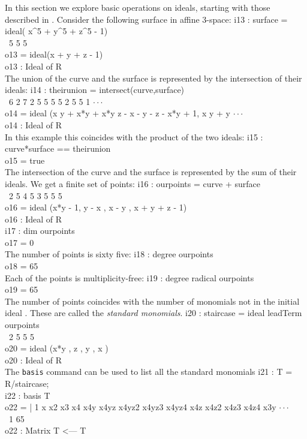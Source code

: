 In this section we explore basic operations on ideals,
starting with those described in \cite[\S 4.3]{CLO1}.
Consider the following surface in affine $3$-space:
\beginOutput
i13 : surface = ideal( x^5 + y^5 + z^5 - 1)\\
\emptyLine
\             5    5    5\\
o13 = ideal(x  + y  + z  - 1)\\
\emptyLine
o13 : Ideal of R\\
\endOutput
The union of the curve and the surface is represented by the 
intersection of their ideals:
\beginOutput
i14 : theirunion = intersect(curve,surface)\\
\emptyLine
\              6 2      7      2 5    5    5    5      2       5 5    1 $\cdot\cdot\cdot$\\
o14 = ideal (x y  + x*y  + x*y z  - x  - y  - z  - x*y  + 1, x y  + y  $\cdot\cdot\cdot$\\
\emptyLine
o14 : Ideal of R\\
\endOutput
In this example this coincides with the product of the two ideals:
\beginOutput
i15 : curve*surface == theirunion\\
\emptyLine
o15 = true\\
\endOutput
The intersection of the curve and the surface is represented by the 
sum of their ideals. We get a finite set of points:
\beginOutput
i16 : ourpoints = curve + surface\\
\emptyLine
\                2       5    4   5    3   5    5    5\\
o16 = ideal (x*y  - 1, y  - x , x  - y , x  + y  + z  - 1)\\
\emptyLine
o16 : Ideal of R\\
\endOutput
\beginOutput
i17 : dim ourpoints\\
\emptyLine
o17 = 0\\
\endOutput
The number of points is sixty five:
\beginOutput
i18 : degree ourpoints\\
\emptyLine
o18 = 65\\
\endOutput
Each of the points is multiplicity-free:
\beginOutput
i19 : degree radical ourpoints\\
\emptyLine
o19 = 65\\
\endOutput
The number of points coincides with the number of 
monomials not in the initial ideal \cite[\S 2.2]{CLO2}.
These are called the {\it standard monomials}.
\beginOutput
i20 : staircase = ideal leadTerm ourpoints\\
\emptyLine
\                2   5   5   5\\
o20 = ideal (x*y , z , y , x )\\
\emptyLine
o20 : Ideal of R\\
\endOutput
The {\tt basis} command can be used to list all the standard monomials
\beginOutput
i21 : T = R/staircase;\\
\endOutput
\beginOutput
i22 : basis T\\
\emptyLine
o22 = | 1 x x2 x3 x4 x4y x4yz x4yz2 x4yz3 x4yz4 x4z x4z2 x4z3 x4z4 x3y $\cdot\cdot\cdot$\\
\emptyLine
\              1       65\\
o22 : Matrix T  <--- T\\
\endOutput

